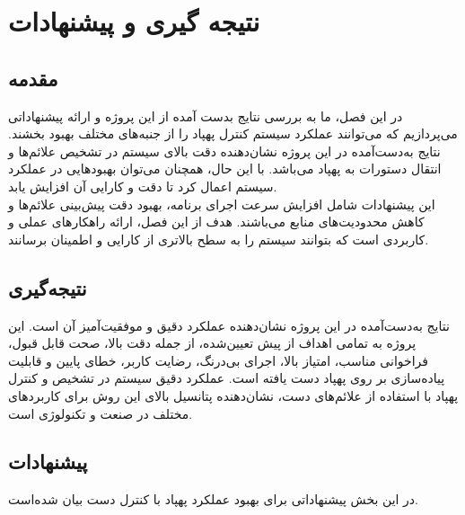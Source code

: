 \chapter{نتیجه گیری و پیشنهادات}
\section{مقدمه}
در این فصل، ما به بررسی نتایج بدست آمده از این پروژه و ارائه پیشنهاداتی می‌پردازیم که می‌توانند عملکرد سیستم کنترل پهپاد را از جنبه‌های مختلف بهبود بخشند. نتایج به‌دست‌آمده در این پروژه نشان‌دهنده دقت بالای سیستم در تشخیص علائم‌ها و انتقال دستورات به پهپاد می‌باشد. با این حال، همچنان می‌توان بهبودهایی در عملکرد سیستم اعمال کرد تا دقت و کارایی آن افزایش یابد.
\\
این پیشنهادات شامل افزایش سرعت اجرای برنامه، بهبود دقت پیش‌بینی علائم‌ها و کاهش محدودیت‌های منابع می‌باشند. هدف از این فصل، ارائه راهکارهای عملی و کاربردی است که بتوانند سیستم را به سطح بالاتری از کارایی و اطمینان برسانند.


\section{نتیجه‌گیری}
نتایج به‌دست‌آمده در این پروژه نشان‌دهنده عملکرد دقیق و موفقیت‌آمیز آن است. این پروژه به تمامی اهداف از پیش تعیین‌شده، از جمله دقت بالا، صحت قابل قبول، فراخوانی مناسب، امتیاز  بالا، اجرای بی‌درنگ، رضایت کاربر، خطای پایین و قابلیت پیاده‌سازی بر روی پهپاد دست یافته است. عملکرد دقیق سیستم در تشخیص و کنترل پهپاد با استفاده از علائم‌های دست، نشان‌دهنده پتانسیل بالای این روش برای کاربردهای مختلف در صنعت و تکنولوژی است.


\section{پیشنهادات}
در این بخش پیشنهاداتی برای بهبود عملکرد پهپاد با کنترل دست بیان شده‌است.
